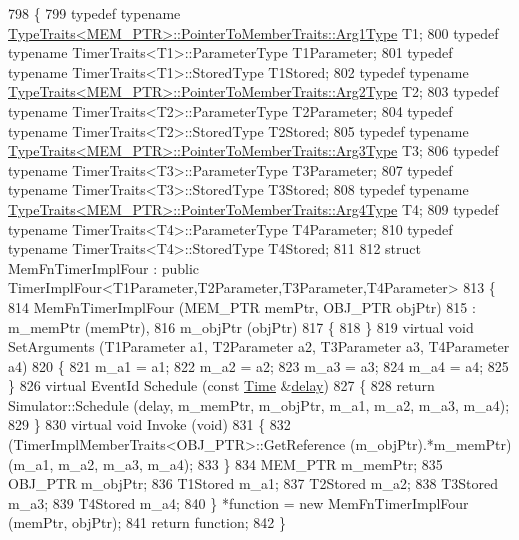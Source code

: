 \begin{DoxyCode}
798 \{
799   \textcolor{keyword}{typedef} \textcolor{keyword}{typename} \hyperlink{structTypeTraits}{TypeTraits<MEM\_PTR>::PointerToMemberTraits::Arg1Type}
       T1;
800   \textcolor{keyword}{typedef} \textcolor{keyword}{typename} TimerTraits<T1>::ParameterType T1Parameter;
801   \textcolor{keyword}{typedef} \textcolor{keyword}{typename} TimerTraits<T1>::StoredType T1Stored;
802   \textcolor{keyword}{typedef} \textcolor{keyword}{typename} \hyperlink{structTypeTraits}{TypeTraits<MEM\_PTR>::PointerToMemberTraits::Arg2Type}
       T2;
803   \textcolor{keyword}{typedef} \textcolor{keyword}{typename} TimerTraits<T2>::ParameterType T2Parameter;
804   \textcolor{keyword}{typedef} \textcolor{keyword}{typename} TimerTraits<T2>::StoredType T2Stored;
805   \textcolor{keyword}{typedef} \textcolor{keyword}{typename} \hyperlink{structTypeTraits}{TypeTraits<MEM\_PTR>::PointerToMemberTraits::Arg3Type}
       T3;
806   \textcolor{keyword}{typedef} \textcolor{keyword}{typename} TimerTraits<T3>::ParameterType T3Parameter;
807   \textcolor{keyword}{typedef} \textcolor{keyword}{typename} TimerTraits<T3>::StoredType T3Stored;
808   \textcolor{keyword}{typedef} \textcolor{keyword}{typename} \hyperlink{structTypeTraits}{TypeTraits<MEM\_PTR>::PointerToMemberTraits::Arg4Type}
       T4;
809   \textcolor{keyword}{typedef} \textcolor{keyword}{typename} TimerTraits<T4>::ParameterType T4Parameter;
810   \textcolor{keyword}{typedef} \textcolor{keyword}{typename} TimerTraits<T4>::StoredType T4Stored;
811 
812   \textcolor{keyword}{struct }MemFnTimerImplFour : \textcolor{keyword}{public} TimerImplFour<T1Parameter,T2Parameter,T3Parameter,T4Parameter>
813   \{
814     MemFnTimerImplFour (MEM\_PTR memPtr, OBJ\_PTR objPtr)
815       : m\_memPtr (memPtr),
816         m\_objPtr (objPtr)
817     \{
818     \}
819     \textcolor{keyword}{virtual} \textcolor{keywordtype}{void} SetArguments (T1Parameter a1, T2Parameter a2, T3Parameter a3, T4Parameter a4)
820     \{
821       m\_a1 = a1;
822       m\_a2 = a2;
823       m\_a3 = a3;
824       m\_a4 = a4;
825     \}
826     \textcolor{keyword}{virtual} EventId Schedule (\textcolor{keyword}{const} \hyperlink{namespacens3_1_1TracedValueCallback_a7ffd3e7c142ffe7c8a1d2db9b8de38ec}{Time} &\hyperlink{lte_2model_2fading-traces_2fading__trace__generator_8m_a7964e6aa8f61a9d28973c8267a606ad8}{delay})
827     \{
828       \textcolor{keywordflow}{return} Simulator::Schedule (delay, m\_memPtr, m\_objPtr, m\_a1, m\_a2, m\_a3, m\_a4);
829     \}
830     \textcolor{keyword}{virtual} \textcolor{keywordtype}{void} Invoke (\textcolor{keywordtype}{void})
831     \{
832       (TimerImplMemberTraits<OBJ\_PTR>::GetReference (m\_objPtr).*m\_memPtr)(m\_a1, m\_a2, m\_a3, m\_a4);
833     \}
834     MEM\_PTR m\_memPtr;
835     OBJ\_PTR m\_objPtr;
836     T1Stored m\_a1;
837     T2Stored m\_a2;
838     T3Stored m\_a3;
839     T4Stored m\_a4;
840   \} *\textcolor{keyword}{function} = \textcolor{keyword}{new} MemFnTimerImplFour (memPtr, objPtr);
841   \textcolor{keywordflow}{return} \textcolor{keyword}{function};
842 \}
\end{DoxyCode}


